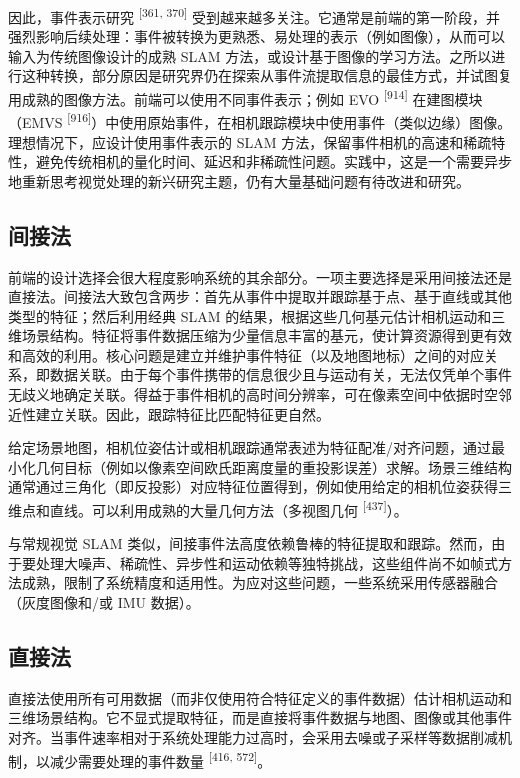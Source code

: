 因此，事件表示研究 \textsuperscript{[361, 370]} 受到越来越多关注。它通常是前端的第一阶段，并强烈影响后续处理：事件被转换为更熟悉、易处理的表示（例如图像），从而可以输入为传统图像设计的成熟 SLAM 方法，或设计基于图像的学习方法。之所以进行这种转换，部分原因是研究界仍在探索从事件流提取信息的最佳方式，并试图复用成熟的图像方法。前端可以使用不同事件表示；例如 EVO \textsuperscript{[914]} 在建图模块（EMVS \textsuperscript{[916]}）中使用原始事件，在相机跟踪模块中使用事件（类似边缘）图像。理想情况下，应设计使用事件表示的 SLAM 方法，保留事件相机的高速和稀疏特性，避免传统相机的量化时间、延迟和非稀疏性问题。实践中，这是一个需要异步地重新思考视觉处理的新兴研究主题，仍有大量基础问题有待改进和研究。

\subsection{间接法}

前端的设计选择会很大程度影响系统的其余部分。一项主要选择是采用间接法还是直接法。间接法大致包含两步：首先从事件中提取并跟踪基于点、基于直线或其他类型的特征；然后利用经典 SLAM 的结果，根据这些几何基元估计相机运动和三维场景结构。特征将事件数据压缩为少量信息丰富的基元，使计算资源得到更有效和高效的利用。核心问题是建立并维护事件特征（以及地图地标）之间的对应关系，即数据关联。由于每个事件携带的信息很少且与运动有关，无法仅凭单个事件无歧义地确定关联。得益于事件相机的高时间分辨率，可在像素空间中依据时空邻近性建立关联。因此，跟踪特征比匹配特征更自然。

给定场景地图，相机位姿估计或相机跟踪通常表述为特征配准/对齐问题，通过最小化几何目标（例如以像素空间欧氏距离度量的重投影误差）求解。场景三维结构通常通过三角化（即反投影）对应特征位置得到，例如使用给定的相机位姿获得三维点和直线。可以利用成熟的大量几何方法（多视图几何 \textsuperscript{[437]}）。

与常规视觉 SLAM 类似，间接事件法高度依赖鲁棒的特征提取和跟踪。然而，由于要处理大噪声、稀疏性、异步性和运动依赖等独特挑战，这些组件尚不如帧式方法成熟，限制了系统精度和适用性。为应对这些问题，一些系统采用传感器融合（灰度图像和/或 IMU 数据）。

\subsection{直接法}

直接法使用所有可用数据（而非仅使用符合特征定义的事件数据）估计相机运动和三维场景结构。它不显式提取特征，而是直接将事件数据与地图、图像或其他事件对齐。当事件速率相对于系统处理能力过高时，会采用去噪或子采样等数据削减机制，以减少需要处理的事件数量 \textsuperscript{[416, 572]}。

